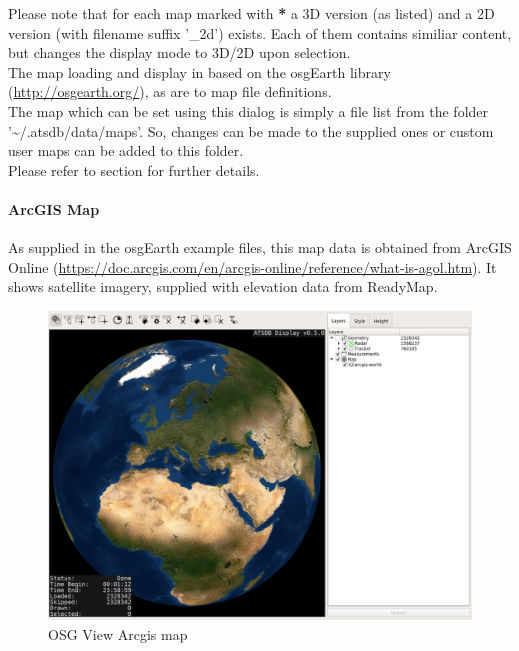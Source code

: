  Please note that for each map marked with \textbf{*} a 3D version (as listed) and a 2D version (with filename suffix '\_2d') exists. Each of them contains similiar content, but changes the display mode to 3D/2D upon selection. \\
 
The map loading and display in based on the osgEarth library (\url{http://osgearth.org/}), as are to map file definitions.  \\

The map which can be set using this dialog is simply a file list from the folder '\textasciitilde/.atsdb/data/maps'. So, changes can be made to the supplied ones or custom user maps can be added to this folder. \\
Please refer to section  for further details.

\newpage
\paragraph{ArcGIS Map}

As supplied in the osgEarth example files, this map data is obtained from ArcGIS Online (\url{https://doc.arcgis.com/en/arcgis-online/reference/what-is-agol.htm}). It shows satellite imagery, supplied with elevation data from ReadyMap. 

\begin{figure}[H]
    \hspace*{-2.5cm}
    \includegraphics[width=19cm,frame]{../screenshots/osgview_arcgis.png}
  \caption{OSG View Arcgis map}
\end{figure}

